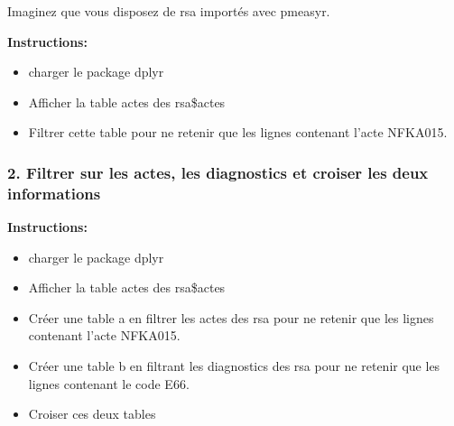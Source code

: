 \documentclass[]{book}
\begin{document}
Imaginez que vous disposez de rsa importés avec pmeasyr.

\textbf{Instructions:}

\begin{itemize}
\item
  charger le package dplyr
\item
  Afficher la table actes des rsa\$actes
\item
  Filtrer cette table pour ne retenir que les lignes contenant l'acte NFKA015.
\end{itemize}

\hypertarget{filtrer-sur-les-actes-les-diagnostics-et-croiser-les-deux-informations}{%
\subsubsection{2. Filtrer sur les actes, les diagnostics et croiser les deux informations}\label{filtrer-sur-les-actes-les-diagnostics-et-croiser-les-deux-informations}}

\textbf{Instructions:}

\begin{itemize}
\item
  charger le package dplyr
\item
  Afficher la table actes des rsa\$actes
\item
  Créer une table a en filtrer les actes des rsa pour ne retenir que les lignes contenant l'acte NFKA015.
\item
  Créer une table b en filtrant les diagnostics des rsa pour ne retenir que les lignes contenant le code E66.
\item
  Croiser ces deux tables
\end{itemize}
\end{document}
